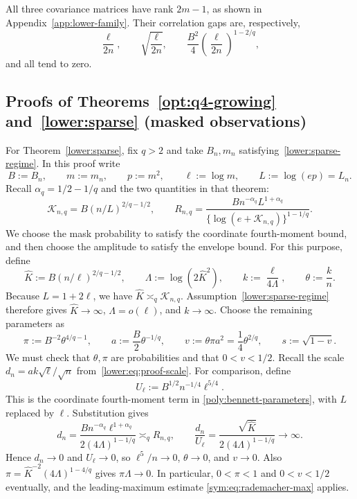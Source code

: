 \documentclass[11pt,letterpaper]{article}
\theoremstyle{remark}
\begin{document}
All three covariance matrices have rank \(2m-1\), as shown in
Appendix~\ref{app:lower-family}. Their correlation gaps are,
respectively,
\[
 \frac{\ell}{2n},\qquad
 \sqrt{\frac{\ell}{2n}},\qquad
 \frac{B^2}{4}\left(\frac{\ell}{2n}\right)^{1-2/q},
\]
and all tend to zero.

\subsection{Proofs of Theorems~\ref*{opt:q4-growing} and~\ref*{lower:sparse} (masked observations)}
\label{app:q4-growing}

For Theorem~\ref{lower:sparse}, fix \(q>2\) and take \(B_n,m_n\)
satisfying~\eqref{lower:sparse-regime}. In this proof write
\[
 B:=B_n,\qquad m:=m_n,\qquad p:=m^2,\qquad
 \ell:=\log m,\qquad L:=\log(ep)=L_n.
\]
Recall \(\alpha_q=1/2-1/q\) and the two quantities in that theorem:
\[
 \mathcal K_{n,q}=B(n/L)^{2/q-1/2},\qquad
 R_{n,q}=\frac{B n^{-\alpha_q}L^{1+\alpha_q}}
                   {\{\log(e+\mathcal K_{n,q})\}^{1-1/q}}.
\]
We choose the mask probability to satisfy the coordinate
fourth-moment bound, and then choose the amplitude to satisfy the
envelope bound. For this purpose, define
\[
 \widehat K:=B(n/\ell)^{2/q-1/2},\qquad
 \Lambda:=\log(2\widehat K^2),\qquad
 k:=\frac{\ell}{4\Lambda},\qquad \theta:=\frac{k}{n}.
\]
Because \(L=1+2\ell\), we have
\(\widehat K\asymp_q\mathcal K_{n,q}\).
Assumption~\eqref{lower:sparse-regime}
therefore gives \(\widehat K\to\infty\), \(\Lambda=o(\ell)\),
and \(k\to\infty\). Choose the remaining parameters as
\begin{equation}
 \pi:=B^{-2}\theta^{4/q-1},\qquad a:=\frac B2\theta^{-1/q},
 \qquad v:=\theta\pi a^2=\frac14\theta^{2/q},\qquad s:=\sqrt{1-v}.
 \label{q4:eq:sparse-parameters}
\end{equation}
We must check that \(\theta,\pi\) are probabilities and that
\(0<v<1/2\). Recall the scale
\(d_n=ak\sqrt\ell/\sqrt n\) from~\eqref{lower:eq:proof-scale}.
For comparison, define
\[
 U_\ell:=B^{1/2}n^{-1/4}\ell^{5/4}.
\]
This is the coordinate fourth-moment term in
\eqref{poly:bennett-parameters}, with \(L\) replaced by \(\ell\).
Substitution gives
\[
 d_n=\frac{B n^{-\alpha_q}\ell^{1+\alpha_q}}
          {2(4\Lambda)^{1-1/q}}\asymp_q R_{n,q},\qquad
 \frac{d_n}{U_\ell}
 =\frac{\sqrt{\widehat K}}{2(4\Lambda)^{1-1/q}}\longrightarrow\infty.
\]
Hence \(d_n\to0\) and \(U_\ell\to0\), so \(\ell^5/n\to0\),
\(\theta\to0\), and \(v\to0\). Also
\(\pi=\widehat K^{-2}(4\Lambda)^{1-4/q}\) gives
\(\pi\Lambda\to0\). In particular, \(0<\pi<1\) and
\(0<v<1/2\) eventually, and the leading-maximum estimate
\eqref{sym:eq:rademacher-max} applies.
\end{document}
